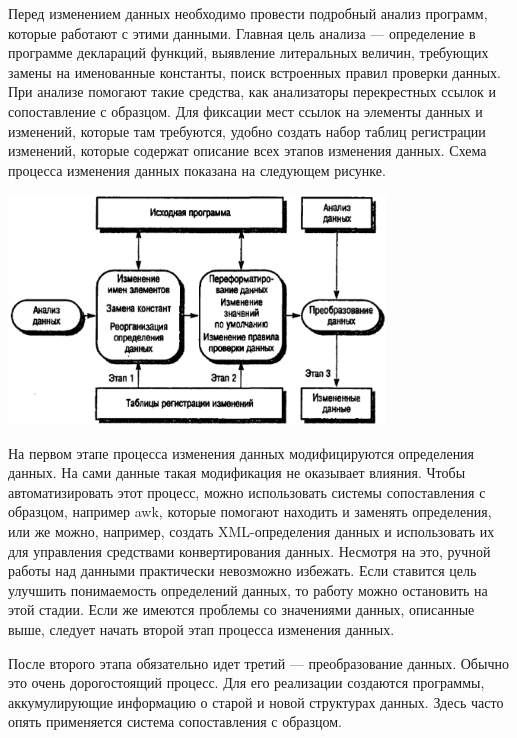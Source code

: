 \documentclass{../../text-style}
\begin{document}
Перед изменением данных необходимо провести подробный анализ программ, которые работают с этими данными. Главная цель анализа --- определение в программе деклараций функций, выявление литеральных величин, требующих замены на именованные константы, поиск встроенных правил проверки данных. При анализе помогают такие средства, как анализаторы перекрестных ссылок и сопоставление с образцом. Для фиксации мест ссылок на элементы данных и изменений, которые там требуются, удобно создать набор таблиц регистрации изменений, которые содержат описание всех этапов изменения данных. Схема процесса изменения данных показана на следующем рисунке.

\begin{center}
    \includegraphics[width=0.75\textwidth]{dataReengineering.png}
\end{center}

На первом этапе процесса изменения данных модифицируются определения данных. На сами данные такая модификация не оказывает влияния. Чтобы автоматизировать этот процесс, можно использовать системы сопоставления с образцом, например awk, которые помогают находить и заменять определения, или же можно, например, создать XML-определения данных и использовать их для управления средствами конвертирования данных. Несмотря на это, ручной работы над данными практически невозможно избежать. Если ставится цель улучшить понимаемость определений данных, то работу можно остановить на этой стадии. Если же имеются проблемы со значениями данных, описанные выше, следует начать второй этап процесса изменения данных.

После второго этапа обязательно идет третий --- преобразование данных. Обычно это очень дорогостоящий процесс. Для его реализации создаются программы, аккумулирующие информацию о старой и новой структурах данных. Здесь часто опять применяется система сопоставления с образцом.
\end{document}

